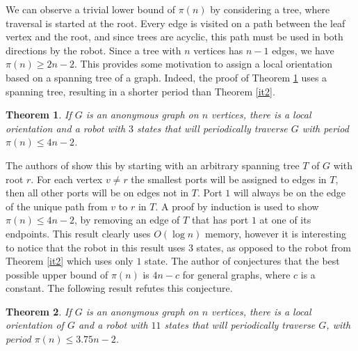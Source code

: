 \documentclass[12pt,letterpaper,oneside]{book}
\newtheorem{theorem}{Theorem}[section]
\begin{document}
We can observe a trivial lower bound of $\pi(n)$ by considering a tree, where 
traversal is started at the root.  Every edge is visited on a path between the leaf vertex and the root, and since 
trees are acyclic, this path must be used in both directions by the robot.  
Since a tree with $n$ vertices has $n-1$ edges, we have $\pi(n)\ge 2n-2$.  This provides 
some motivation to assign a local orientation based on a spanning tree of a graph.  
Indeed, the proof of Theorem \ref{it3} uses a spanning tree, resulting in a shorter period than Theorem \ref{it2}.  

\begin{theorem}\label{it3}
\emph{\cite{I}}  If $G$ is an anonymous graph on $n$ vertices, there is a local 
orientation and a robot with $3$ states that will periodically traverse $G$ with 
period $\pi(n)\le 4n-2$.
\end{theorem}

The authors of \cite{I} show this by starting with an arbitrary spanning tree $T$ of $G$ with root $r$.  For each vertex $v\ne r$ the 
smallest ports will be assigned to edges in $T$, then all other ports will be on edges not in $T$.  Port $1$ will always be 
on the edge of the unique path 
from $v$ to $r$ in $T$.  A proof by induction is used to show $\pi(n)\le 4n-2$, by removing an edge of $T$ that has port $1$ at one of 
its endpoints.  This result clearly uses $O(\log n)$ memory, however it is interesting to notice 
that the robot in this result uses $3$ states, as opposed to the robot from Theorem \ref{it2} which uses only $1$ state.  
The author of \cite{I} conjectures that the best possible upper bound of $\pi(n)$ is $4n-c$ for general graphs, 
where $c$ is a constant.  The following result refutes this conjecture.   

\begin{theorem}\label{it4}
\emph{\cite{GKMNZ}}  If $G$ is an anonymous graph on $n$ vertices, there is a local orientation of $G$ and a robot with $11$ 
states that will periodically traverse $G$, with 
period $\pi(n)\le 3.75n-2$.
\end{theorem}
\end{document}
